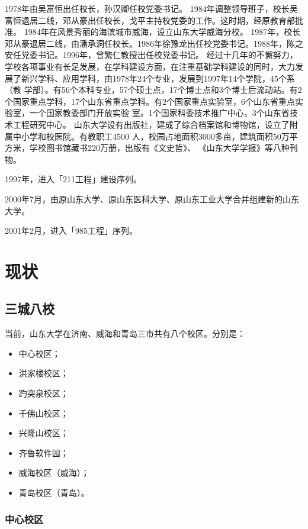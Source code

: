 \documentclass[openany]{sduthesis} %
\begin{document}
1978年由吴富恒出任校长，孙汉卿任校党委书记。 1984年调整领导班子，校长吴富恒退居二线，邓从豪出任校长，戈平主持校党委的工作。这时期，经原教育部批准。 1984年在风景秀丽的海滨城市威海，设立山东大学威海分校。 1987年，校长邓从豪退居二线，由潘承洞任校长。1986年徐豫龙出任校党委书记。1988年，陈之安任党委书记。1996年，曾繁仁教授出任校党委书记。 经过十几年的不懈努力，学校各项事业有长足发展，在学科建设方面，在注重基础学科建设的同时，大力发展了新兴学科、应用学科，由1978年24个专业，发展到1997年14个学院，45个系（教 学部）。有56个本科专业，57个硕士点，17个博士点和3个博士后流动站。有2个国家重点学科，17个山东省重点学科。有2个国家重点实验室，6个山东省重点实验室，一个国家教委部门开放实验 室。1个国家科委技术推广中心，3个山东省技术工程研究中心。 山东大学设有出版社，建成了综合档案馆和博物馆，设立了附属中小学和校医院。有教职工4500 人，校园占地面积3000多亩，建筑面积50万平方米，学校图书馆藏书220万册，出版有《文史哲》、 《山东大学学报》等八种刊物。

1997年，进入「211工程」建设序列。

2000年7月，由原山东大学、原山东医科大学、原山东工业大学合并组建新的山东大学。

2001年2月，进入「985工程」序列。

\chapter{现状}

\section{三城八校}

当前，山东大学在济南、威海和青岛三市共有八个校区。分别是：

\begin{itemize}
  \item 中心校区；
  \item 洪家楼校区；
  \item 趵突泉校区；
  \item 千佛山校区；
  \item 兴隆山校区；
  \item 齐鲁软件园；
  \item 威海校区（威海）；
  \item 青岛校区（青岛）。
\end{itemize}

\subsection{中心校区}
\end{document}
